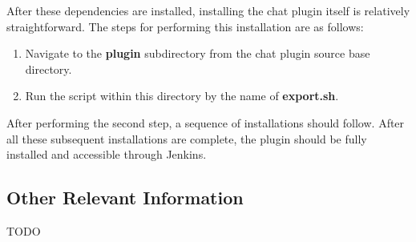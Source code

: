 \documentclass{article}
\begin{document}
		After these dependencies are installed, installing the chat plugin itself
		is relatively straightforward.  The steps for performing this installation
		are as follows:

		\begin{enumerate}
			\item Navigate to the \textbf{plugin} subdirectory from the chat
			plugin source base directory.

			\item Run the script within this directory by the name of 
			\textbf{export.sh}.
		\end{enumerate}

		After performing the second step, a sequence of installations should
		follow.  After all these subsequent installations are complete, the
		plugin should be fully installed and accessible through Jenkins.

		\subsection[Other Information]{Other Relevant Information}
		TODO
\end{document}
